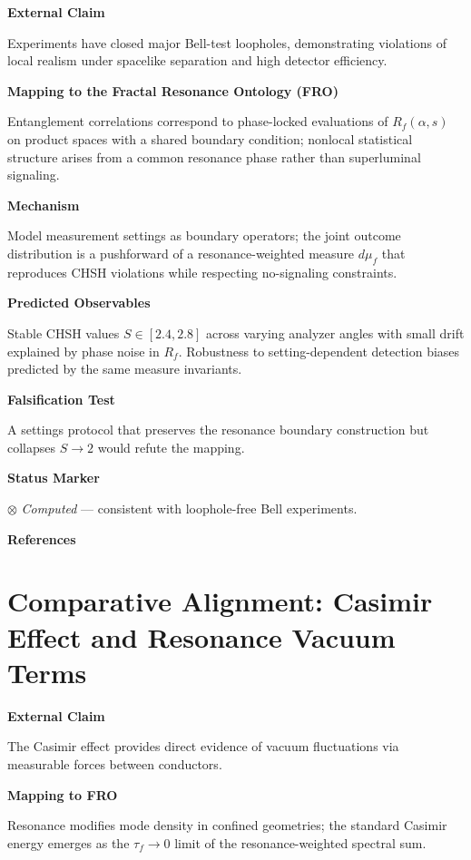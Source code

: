 \textbf{External Claim}

Experiments have closed major Bell-test loopholes, demonstrating violations of local realism under spacelike separation and high detector efficiency.

\textbf{Mapping to the Fractal Resonance Ontology (FRO)}

Entanglement correlations correspond to phase-locked evaluations of $R_f(\alpha,s)$ on product spaces with a shared boundary condition; nonlocal statistical structure arises from a common resonance phase rather than superluminal signaling.

\textbf{Mechanism}

Model measurement settings as boundary operators; the joint outcome distribution is a pushforward of a resonance-weighted measure $d\mu_f$ that reproduces CHSH violations while respecting no-signaling constraints.

\textbf{Predicted Observables}

Stable CHSH values $S \in [2.4, 2.8]$ across varying analyzer angles with small drift explained by phase noise in $R_f$. Robustness to setting-dependent detection biases predicted by the same measure invariants.

\textbf{Falsification Test}

A settings protocol that preserves the resonance boundary construction but collapses $S\to 2$ would refute the mapping.

\textbf{Status Marker}

$\otimes$ \textit{Computed} --- consistent with loophole-free Bell experiments.

\textbf{References}

\cite{bell1964,hensen2015loophole,shalm2015strong,aspect1982experimental}

\section{Comparative Alignment: Casimir Effect and Resonance Vacuum Terms}

\textbf{External Claim}

The Casimir effect provides direct evidence of vacuum fluctuations via measurable forces between conductors.

\textbf{Mapping to FRO}

Resonance modifies mode density in confined geometries; the standard Casimir energy emerges as the $\tau_f\!\to\!0$ limit of the resonance-weighted spectral sum.

